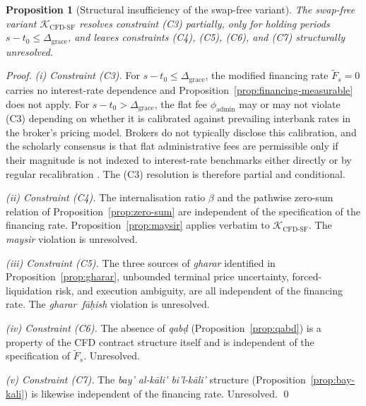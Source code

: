 \documentclass[preprint,12pt,authoryear]{elsarticle}
\newtheorem{proposition}{Proposition}[section]
\theoremstyle{definition}
\begin{document}
\begin{proposition}[Structural insufficiency of the swap-free
    variant]
\label{prop:swap-free}
The swap-free variant $\mathcal{K}_{\text{CFD-SF}}$ resolves
constraint (C3) partially, only for holding periods
$s - t_0 \leq \Delta_{\text{grace}}$, and leaves constraints
(C4), (C5), (C6), and (C7) structurally unresolved.
\end{proposition}

\begin{proof}
\emph{(i) Constraint (C3).} For
$s - t_0 \leq \Delta_{\text{grace}}$, the modified financing rate
$\widetilde{F}_s = 0$ carries no interest-rate dependence and
Proposition~\ref{prop:financing-measurable} does not apply. For
$s - t_0 > \Delta_{\text{grace}}$, the flat fee
$\phi_{\text{admin}}$ may or may not violate (C3) depending on
whether it is calibrated against prevailing interbank rates in the
broker's pricing model. Brokers do not typically disclose this
calibration, and the scholarly consensus is that flat administrative
fees are permissible only if their magnitude is not indexed to
interest-rate benchmarks either directly or by regular recalibration
\citep{AlSuwailem2006,Uberoi2008}. The (C3) resolution is therefore
partial and conditional.

\emph{(ii) Constraint (C4).} The internalisation ratio $\beta$ and
the pathwise zero-sum relation of Proposition~\ref{prop:zero-sum}
are independent of the specification of the financing rate.
Proposition~\ref{prop:maysir} applies verbatim to
$\mathcal{K}_{\text{CFD-SF}}$. The \emph{maysir} violation is
unresolved.

\emph{(iii) Constraint (C5).} The three sources of \emph{gharar}
identified in Proposition~\ref{prop:gharar}, unbounded terminal
price uncertainty, forced-liquidation risk, and execution ambiguity,
are all independent of the financing rate. The
\emph{gharar~f\={a}\d{h}ish} violation is unresolved.

\emph{(iv) Constraint (C6).} The absence of \emph{qab\d{d}}
(Proposition~\ref{prop:qabd}) is a property of the CFD contract
structure itself and is independent of the specification of
$\widetilde{F}_s$. Unresolved.

\emph{(v) Constraint (C7).} The
\emph{bay' al-k\={a}li' bi'l-k\={a}li'} structure
(Proposition~\ref{prop:bay-kali}) is likewise independent of the
financing rate. Unresolved. \qed
\end{proof}
\end{document}
